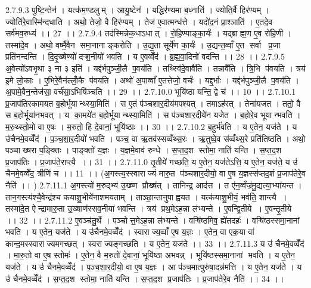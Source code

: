 2.7.9.3
पुष्टि॒न्तेन॑ । यत्क॑म॒ण्डलुम् । आयु॒ष्टेन॑ । यद्धिर॑ण्यमा ब॒ध्नाति॑ । ज्योति॒र्वै हिर॑ण्यम् । ज्योति॑रे॒वास्मि॑न्दधाति । अथो॒ तेजो॒ वै हिर॑ण्यम् । तेज॑ ए॒वात्मन्ध॑त्ते । यदो॑द॒नं प्रा॒श्ञाति॑ । ए॒तदे॒व सर्व॑मव॒रुध्य॑ ।। 27 ।।
2.7.9.4
तद॑स्मिन्नेक॒धाऽधात् । रो॒हि॒ण्याङ्का॒र्यः॑ । यद्ब्राह्म॒ण ए॒व रो॑हि॒णी । तस्मा॑दे॒व । अथो॒ वर्ष्मै॒वैन॑ समा॒नानाङ्करोति । उ॒द्य॒ता सूर्ये॑ण का॒र्यः॑ । उ॒द्यन्त॒व्वाँ ए॒त सर्वा प्र॒जा प्रति॑नन्दन्ति । दि॒दृ॒ख्षेण्यो॑ दऱ्श॒नीयो॑ भवति । य ए॒वव्वेँद॑ । ब्र॒ह्म॒वा॒दिनो॑ वदन्ति ।। 28 ।।
2.7.9.5
अ॒वेत्यो॑ऽवभृ॒था ३ ना ३ इति॑ । यद्द॑र्भपुञ्जी॒लै प॒वय॑ति । तथ्स्वि॑दे॒वावै॑ति । तन्नावै॑ति । त्रि॒भि प॑वयति । त्रय॑ इ॒मे लो॒काः । ए॒भिरे॒वैन॑ल्लोँ॒कै प॑वयति । अथो॑ अ॒पाव्वाँ ए॒तत्तेजो॒ वर्चः॑ । यद्द॒र्भाः । यद्द॑र्भपुञ्जी॒लै प॒वय॑ति । अ॒पामे॒वैन॒न्तेज॑सा॒ वर्च॑सा॒ऽभिषि॑ञ्चति ।। 29 ।।
2.7.10.0
भूयि॑ष्ठा यन्ति॒ द्वे च॑ ।। 10 ।।
2.7.10.1
प्र॒जाप॑तिरकामयत ब॒होर्भूयान्थ्स्या॒मिति॑ । स ए॒तं प॑ञ्चशार॒दीय॑मपश्यत् । तमाऽह॑रत् । तेना॑यजत । ततो॒ वै स ब॒होर्भूया॑नभवत् । य का॒मये॑त ब॒होर्भूयान्थ्स्या॒मिति॑ । स प॑ञ्चशार॒दीये॑न यजेत । ब॒होरे॒व भूयान्भवति । म॒रु॒थ्स्तो॒मो वा ए॒षः । म॒रुतो॒ हि दे॒वानां॒ भूयि॑ष्ठाः ।। 30 ।।
2.7.10.2
ब॒हुर्भ॑वति । य ए॒तेन॒ यज॑ते । य उ॑चैनमे॒वव्वेँद॑ । प॒ञ्च॒शा॒र॒दीयो॑ भवति । पञ्च॒ वा ऋ॒तव॑स्सव्वँथ्स॒रः । ऋ॒तुष्वे॒व स॑व्वँथ्स॒रे प्रति॑तिष्ठति । अथो॒ पञ्चाख्षरा प॒ङ्क्तिः । पाङ्क्तो॑ य॒ज्ञः । य॒ज्ञमे॒वाव॑ रुन्धे । स॒प्त॒द॒श स्तोमा॒ नाति॑ यन्ति । स॒प्त॒द॒श प्र॒जाप॑तिः । प्र॒जाप॑ते॒राप्त्यै ।। 31 ।।
2.7.11.0
तृ॒तीये॑ गच्छति॒ य ए॒तेन॒ यज॑तेऽत्ति॒ य ए॒तेन॒ यज॑ते॒ य उ॑ चैनमे॒वव्वेँद॒ त्रीणि॑ च ।। 11 ।। (अ॒गस्त्य॒स्स्वाराज्यं मारु॒त प॑ञ्चशार॒दीयो॒ वा ए॒ष य॒ज्ञस्स॑प्तद॒शं प्र॒जाप॑तेरे॒व नैति॑ ।। )
2.7.11.1
अ॒गस्त्यो॑ म॒रुद्भ्य॑ उ॒ख्ष्ण प्रौख्ष॑त् । तानिन्द्र॒ आद॑त्त । त ए॑न॒व्वँज्र॑मु॒द्यत्या॒भ्या॑यन्त । तान॒गस्त्य॑श्चै॒वेन्द्र॑श्च कयाशु॒भीये॑नाशमयताम् । ताञ्छा॒न्तानुपाह्वयत । यत्क॑याशु॒भीयं॒ भव॑ति॒ शान्त्यै । तस्मा॑दे॒त ऐन्द्रामारु॒ता उ॒ख्षाण॑स्सव॒नीया॑ भवन्ति । त्रय॑ प्रथ॒मेऽह॒न्ना ल॑भ्यन्ते । ए॒वन्द्वि॒तीये । ए॒वन्तृ॒तीये ।। 32 ।।
2.7.11.2
ए॒वञ्च॑तु॒र्थे । पञ्चोत्त॒मेऽह॒न्ना ल॑भ्यन्ते । वऱ्षि॑ष्ठमिव॒ ह्ये॑तदहः॑ । वऱ्षि॑ष्ठस्समा॒नानां भवति । य ए॒तेन॒ यज॑ते । य उ॑चैनमे॒वव्वेँद॑ । स्वाराज्य॒व्वाँ ए॒ष य॒ज्ञः । ए॒तेन॒ वा एक॒या वा॑ कान्द॒मस्स्वाराज्यमगच्छत् । स्वराज्यङ्गच्छति । य ए॒तेन॒ यज॑ते ।। 33 ।।
2.7.11.3
य उ॑ चैनमे॒वव्वेँद॑ । मा॒रु॒तो वा ए॒ष स्तोमः॑ । ए॒तेन॒ वै म॒रुतो॑ दे॒वानां॒ भूयि॑ष्ठा अभवन्न् । भूयि॑ष्ठस्समा॒नानां भवति । य ए॒तेन॒ यज॑ते । य उ॑ चैनमे॒वव्वेँद॑ । प॒ञ्च॒शा॒र॒दीयो॒ वा ए॒ष य॒ज्ञः । आ प॑ञ्च॒मात्पुरु॑षा॒दन्न॑मत्ति । य ए॒तेन॒ यज॑ते । य उ॑ चैनमे॒वव्वेँद॑ । स॒प्त॒द॒श स्तोमा॒ नाति॑ यन्ति । स॒प्त॒द॒श प्र॒जाप॑तिः । प्र॒जाप॑तेरे॒व नैति॑ ।। 34 ।।
